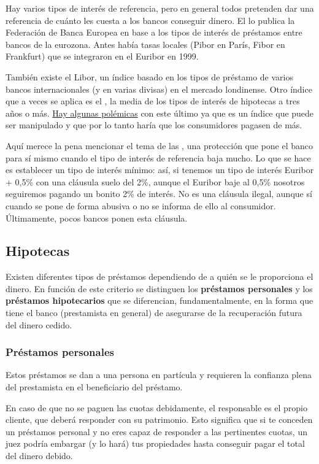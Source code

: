 \documentclass[nochap,palatino,shortheader]{apuntes}
\begin{document}
Hay varios tipos de interés de referencia, pero en general todos pretenden dar una referencia de cuánto les cuesta a los bancos conseguir dinero. El  lo publica la Federación de Banca Europea en base a los tipos de interés de préstamos entre bancos de la eurozona. Antes había tasas locales (Pibor en París, Fibor en Frankfurt) que se integraron en el Euribor en 1999.

También existe el Libor, un índice basado en los tipos de préstamo de varios bancos internacionales (y en varias divisas) en el mercado londinense. Otro índice que a veces se aplica es el , la media de los tipos de interés de hipotecas a tres años o más. \href{https://es.wikipedia.org/wiki/%C3%8Dndice_de_Referencia_de_Pr%C3%A9stamos_Hipotecarios}{Hay algunas polémicas} con este último ya que es un índice que puede ser manipulado y que por lo tanto haría que los consumidores pagasen de más.

Aquí merece la pena mencionar el tema de las , una protección que pone el banco para sí mismo cuando el tipo de interés de referencia baja mucho. Lo que se hace es establecer un tipo de interés mínimo: así, si tenemos un tipo de interés Euribor + 0,5\% con una cláusula suelo del 2\%, aunque el Euribor baje al 0,5\% nosotros seguiremos pagando un bonito 2\% de interés. No es una cláusula ilegal, aunque sí cuando se pone de forma abusiva o no se informa de ello al consumidor. Últimamente, pocos bancos ponen esta cláusula.

\subsection{Hipotecas}
Existen diferentes tipos de préstamos dependiendo de a quién se le proporciona el dinero. En función de este criterio se distinguen los \textbf{préstamos personales} y los \textbf{préstamos hipotecarios} que se diferencian, fundamentalmente, en la forma que tiene el banco (prestamista en general) de asegurarse de la recuperación futura del dinero cedido.

\subsubsection{Préstamos personales}
Estos préstamos se dan a una persona en partícula y requieren la confianza plena del prestamista en el beneficiario del préstamo.

En caso de que no se paguen las cuotas debidamente, el responsable es el propio cliente, que deberá responder con su patrimonio. Esto significa que si te conceden un préstamos personal y no eres capaz de responder a las pertinentes cuotas, un juez podría embargar (y lo hará) tus propiedades hasta conseguir pagar el total del dinero debido.
\end{document}
